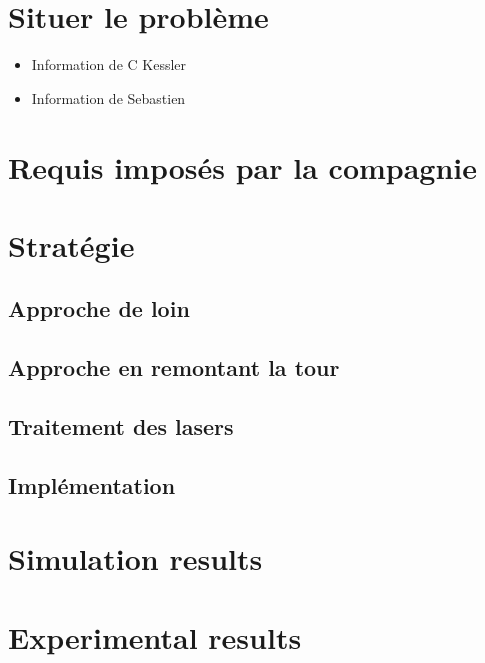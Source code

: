 \label{sec:uav}

\section{Situer le problème}

\begin{itemize}
  \item Information de C Kessler
  \item Information de Sebastien
\end{itemize}

\section{Requis imposés par la compagnie}

\section{Stratégie}

\subsection{Approche de loin}

\subsection{Approche en remontant la tour}


\subsection{Traitement des lasers}


\subsection{Implémentation}


\section{Simulation results}


\section{Experimental results}

\subsection{}
